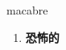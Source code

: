 
\begin{frame}
{\huge macabre}
\begin{center}
\begin{enumerate}\Large
  \item \textbf{恐怖的}
\end{enumerate}
\end{center}
\end{frame}
